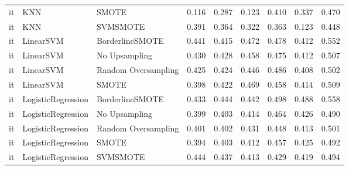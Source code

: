\begin{tabular}{lllllllll}
      it &                          KNN &               SMOTE & 0.116 &                     0.287 &                 0.123 &                  0.410 &                                   0.337 &     0.470 \\
      it &                          KNN &            SVMSMOTE & 0.391 &                     0.364 &                 0.322 &                  0.363 &                                   0.123 &     0.448 \\
      it &                    LinearSVM &     BorderlineSMOTE & 0.441 &                     0.415 &                 0.472 &                  0.478 &                                   0.412 &     0.552 \\
      it &                    LinearSVM &       No Upsampling & 0.430 &                     0.428 &                 0.458 &                  0.475 &                                   0.412 &     0.507 \\
      it &                    LinearSVM & Random Oversampling & 0.425 &                     0.424 &                 0.446 &                  0.486 &                                   0.408 &     0.502 \\
      it &                    LinearSVM &               SMOTE & 0.398 &                     0.422 &                 0.469 &                  0.458 &                                   0.414 &     0.509 \\
      it &           LogisticRegression &     BorderlineSMOTE & 0.433 &                     0.444 &                 0.442 &                  0.498 &                                   0.488 &     0.558 \\
      it &           LogisticRegression &       No Upsampling & 0.399 &                     0.403 &                 0.414 &                  0.464 &                                   0.426 &     0.490 \\
      it &           LogisticRegression & Random Oversampling & 0.401 &                     0.402 &                 0.431 &                  0.448 &                                   0.413 &     0.501 \\
      it &           LogisticRegression &               SMOTE & 0.394 &                     0.403 &                 0.412 &                  0.457 &                                   0.425 &     0.492 \\
      it &           LogisticRegression &            SVMSMOTE & 0.444 &                     0.437 &                 0.413 &                  0.429 &                                   0.419 &     0.494 \\

\end{tabular}
